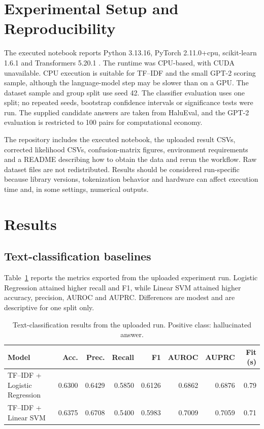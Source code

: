 \documentclass[acmsmall,nonacm]{acmart}
\begin{document}
\section{Experimental Setup and Reproducibility}
The executed notebook reports Python 3.13.16, PyTorch 2.11.0+cpu, scikit-learn 1.6.1 \citep{pedregosa2011scikit} and Transformers 5.20.1 \citep{wolf2020transformers}. The runtime was CPU-based, with CUDA unavailable. CPU execution is suitable for TF--IDF and the small GPT-2 scoring sample, although the language-model step may be slower than on a GPU. The dataset sample and group split use seed 42. The classifier evaluation uses one split; no repeated seeds, bootstrap confidence intervals or significance tests were run. The supplied candidate answers are taken from HaluEval, and the GPT-2 evaluation is restricted to 100 pairs for computational economy.

The repository includes the executed notebook, the uploaded result CSVs, corrected likelihood CSVs, confusion-matrix figures, environment requirements and a README describing how to obtain the data and rerun the workflow. Raw dataset files are not redistributed. Results should be considered run-specific because library versions, tokenization behavior and hardware can affect execution time and, in some settings, numerical outputs.

\section{Results}
\subsection{Text-classification baselines}
Table~\ref{tab:baselines} reports the metrics exported from the uploaded experiment run. Logistic Regression attained higher recall and F1, while Linear SVM attained higher accuracy, precision, AUROC and AUPRC. Differences are modest and are descriptive for one split only.
\begin{table}[t]
\centering
\caption{Text-classification results from the uploaded run. Positive class: hallucinated answer.}
\label{tab:baselines}
\begin{tabular}{lrrrrrrr}
\toprule
Model & Acc. & Prec. & Recall & F1 & AUROC & AUPRC & Fit (s)\\
\midrule
TF--IDF + Logistic Regression & 0.6300 & 0.6429 & 0.5850 & 0.6126 & 0.6862 & 0.6876 & 0.79\\
TF--IDF + Linear SVM & 0.6375 & 0.6708 & 0.5400 & 0.5983 & 0.7009 & 0.7059 & 0.71\\
\bottomrule
\end{tabular}
\end{table}
\end{document}
